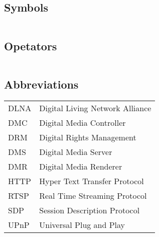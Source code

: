 
\subsection*{Symbols}

\begin{tabular}{ll}

\end{tabular}

\subsection*{Opetators} 

\begin{tabular}{ll}

\end{tabular}

\subsection*{Abbreviations}

\begin{tabular}{ll}
DLNA       & Digital Living Network Alliance\label{dlna_shortfor} \\ 
DMC        & Digital Media Controller \\
DRM        & Digital Rights Management \\ 
DMS        & Digital Media Server \\
DMR        & Digital Media Renderer \\
HTTP       & Hyper Text Transfer Protocol \\
RTSP       & Real Time Streaming Protocol \\
SDP    	& Session Description Protocol\\ 
UPnP	   & Universal Plug and Play \label{upnp_shortfor} \\
\end{tabular}
